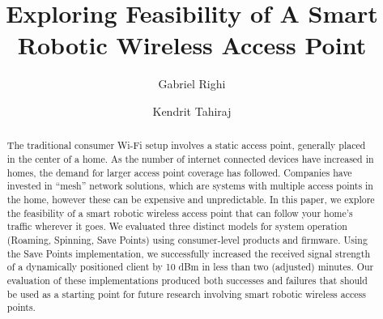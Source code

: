 \documentclass[sigconf]{acmart}
\begin{document}
\title{Exploring Feasibility of A Smart Robotic Wireless Access Point}


\author{Gabriel Righi \and Kendrit Tahiraj}

\renewcommand{\shortauthors}{X.et al.}

\begin{abstract}
    The traditional consumer Wi-Fi setup involves a static access point, generally placed in the center of a home. As the number of internet connected devices have increased in homes, the demand for larger access point coverage has followed. Companies have invested in “mesh” network solutions, which are systems with multiple access points in the home, however these can be expensive and unpredictable. In this paper, we explore the feasibility of a smart robotic wireless access point that can follow your home’s traffic wherever it goes. We evaluated three distinct models for system operation (Roaming, Spinning, Save Points) using consumer-level products and firmware. Using the Save Points implementation, we successfully increased the received signal strength of a dynamically positioned client by 10 dBm in less than two (adjusted) minutes. Our evaluation of these implementations produced both successes and failures that should be used as a starting point for future research involving smart robotic wireless access points.
\end{abstract}

\maketitle





\end{document}
